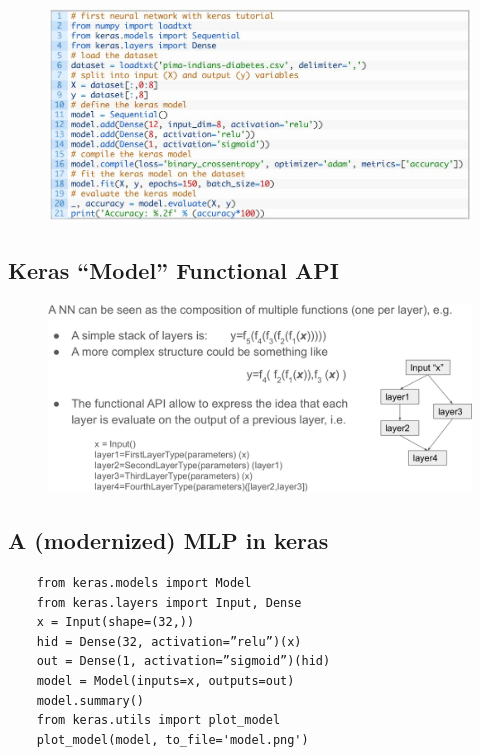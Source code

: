 \begin{figure}[ht]
	\centering
	\includegraphics[width=0.8\linewidth]{figure_ml/seq_ex.png}
\end{figure}
\FloatBarrier
\subsection{Keras “Model” Functional API}

\begin{figure}[ht]
	\centering
	\includegraphics[width=1\linewidth]{figure_ml/keras_model.png}
\end{figure}
\FloatBarrier

\subsection{A (modernized) MLP in keras}

\begin{verbatim}
	from keras.models import Model
	from keras.layers import Input, Dense
	x = Input(shape=(32,))
	hid = Dense(32, activation=”relu”)(x)
	out = Dense(1, activation=”sigmoid”)(hid)
	model = Model(inputs=x, outputs=out)
	model.summary()
	from keras.utils import plot_model
	plot_model(model, to_file='model.png')
\end{verbatim}

